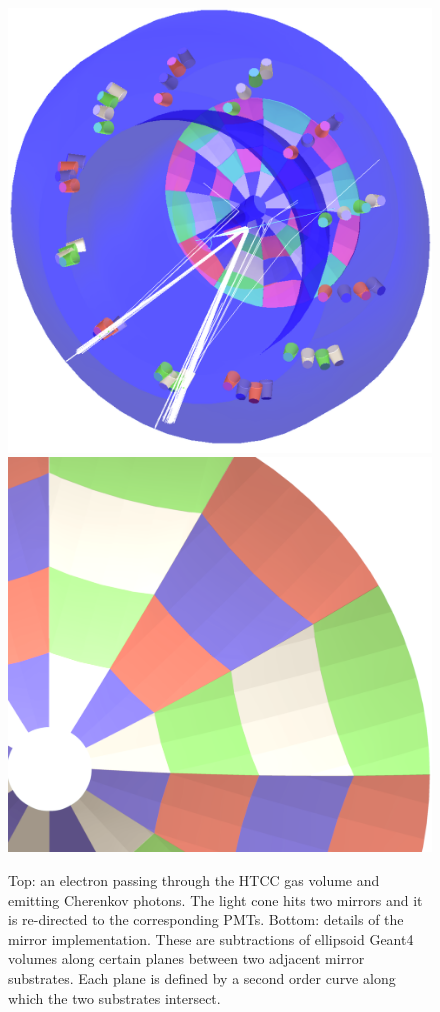 \begin{figure}
	\centering
	\includegraphics[width=0.99\columnwidth,keepaspectratio]{img/htccGeometry.png}
	\includegraphics[width=0.99\columnwidth,keepaspectratio]{img/htccDetail.png}
	\caption{Top: an electron passing through the HTCC gas volume and emitting Cherenkov photons. The light cone
            hits two mirrors and it is re-directed to the corresponding PMTs.
            Bottom: details of the mirror implementation. These are subtractions of ellipsoid Geant4 volumes along
            certain planes between two adjacent mirror substrates. Each plane is defined by a second order
            curve along which the two substrates intersect.}
	\label{fig:htccGeometry}
\end{figure}

